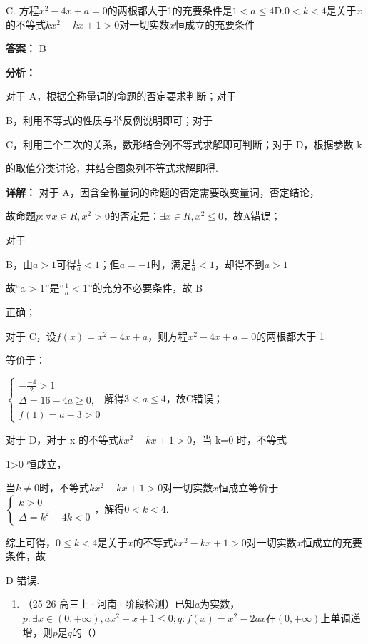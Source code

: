 \documentclass[11pt,a4paper]{ctexart}
\begin{document}
C.
方程\(x^{2} - 4x + a = 0\)的两根都大于1的充要条件是\(1 < a \leq 4\)D.\(0 < k < 4\)是关于\(x\)的不等式\(kx^{2} - kx + 1 > 0\)对一切实数\(x\)恒成立的充要条件

\textbf{答案：}
B

\textbf{分析：}

对于 A，根据全称量词的命题的否定要求判断；对于

B，利用不等式的性质与举反例说明即可；对于

C，利用三个二次的关系，数形结合列不等式求解即可判断；对于 D，根据参数 k

的取值分类讨论，并结合图象列不等式求解即得.

\textbf{详解：}
对于 A，因含全称量词的命题的否定需要改变量词，否定结论，

故命题\(p: \forall x \in R, x^2 > 0\)的否定是：\(\exists x \in R, x^2 \leq 0\)，故A错误；

对于

B，由\(a > 1\)可得\(\frac{1}{a} < 1\)；但\(a = -1\)时，满足\(\frac{1}{a} < 1\)，却得不到\(a > 1\)

故``a \textgreater{} 1''是``\(\frac{1}{a} < 1\)''的充分不必要条件，故 B

正确；

对于 C，设\(f(x)=x^{2}-4x+a\)，则方程\(x^{2}-4x+a=0\)的两根都大于 1

等价于：

\(\left\{ \begin{array}{l} -\frac{-4}{2} > 1 \\ \Delta = 16 - 4a \geq 0, \\ f(1) = a - 3 > 0 \end{array} \right.\)解得\(3 < a \leq 4\)，故C错误；

对于 D，对于 x 的不等式\(kx^{2}-kx+1>0\)，当 k=0 时，不等式

1\textgreater0 恒成立，

当\(k \neq 0\)时，不等式\(kx^{2} - kx + 1 > 0\)对一切实数\(x\)恒成立等价于\(\left\{ \begin{array}{l} k > 0 \\ \Delta = k^{2} - 4k < 0 \end{array} \right.\)，解得\(0 < k < 4\).

综上可得，\(0 \leq k < 4\)是关于\(x\)的不等式\(kx^{2} - kx + 1 > 0\)对一切实数\(x\)恒成立的充要条件，故

D 错误.

\begin{enumerate}[label=\arabic*., leftmargin=*, start=4]
\item （25-26
  高三上·河南·阶段检测）已知\(a\)为实数，\(p: \exists x \in (0, +\infty), ax^2 - x + 1 \leq 0; q: f(x) = x^2 - 2ax\)在\((0, +\infty)\)上单调递增，则\(p\)是\(q\)的（）
\end{enumerate}
\end{document}
